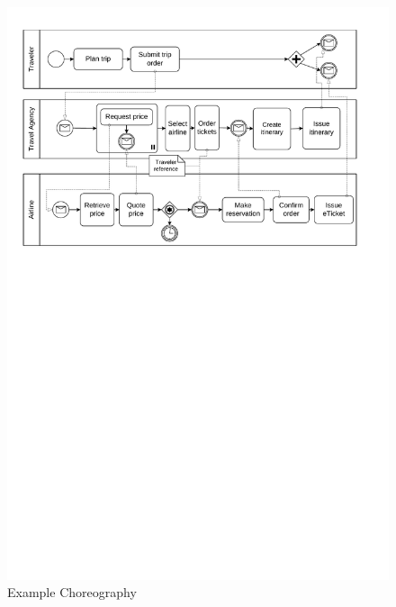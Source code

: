 \begin{figure}
  \centering
  \includegraphics[width=\textwidth]{figures/choreography.pdf}
  \caption{Example Choreography}
  \label{fig:chor1}
\end{figure}

